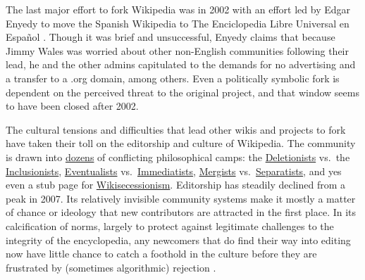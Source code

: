 The last major effort to fork Wikipedia was in 2002 with an effort led
by Edgar Enyedy to move the Spanish Wikipedia to The Enciclopedia Libre
Universal en Español \citep{tkaczSpanishForkWikipedia2011, tkaczWikipediaPoliticsOpenness2014} . Though it was brief and
unsuccessful, Enyedy claims that because Jimmy Wales was worried about
other non-English communities following their lead, he and the other
admins capitulated to the demands for no advertising and a transfer to a
.org domain, among others. Even a politically symbolic fork is
dependent on the perceived threat to the original project, and that
window seems to have been closed after 2002.

The cultural tensions and difficulties that lead other wikis and
projects to fork have taken their toll on the editorship and culture of
Wikipedia. The community is drawn into
\href{https://meta.wikimedia.org/wiki/Conflicting_Wikipedia_philosophies}{dozens}
of conflicting philosophical camps: the
\href{https://meta.wikimedia.org/wiki/Special:MyLanguage/Deletionism}{Deletionists} vs.~the
\href{https://meta.wikimedia.org/wiki/Special:MyLanguage/Inclusionism}{Inclusionists},
\href{https://meta.wikimedia.org/wiki/Eventualism}{Eventualists}
vs.~\href{https://meta.wikimedia.org/wiki/Immediatism}{Immediatists},
\href{https://meta.wikimedia.org/wiki/Special:MyLanguage/Mergism}{Mergists}
vs.~\href{https://meta.wikimedia.org/wiki/Special:MyLanguage/Separatism}{Separatists},
and yes even a stub page for
\href{https://meta.wikimedia.org/wiki/Wikisecessionism}{Wikisecessionism}.
Editorship has steadily declined from a peak in 2007. Its relatively
invisible community systems make it mostly a matter of chance or
ideology that new contributors are attracted in the first place. In its
calcification of norms, largely to protect against legitimate challenges
to the integrity of the encyclopedia, any newcomers that do find their
way into editing now have little chance to catch a foothold in the
culture before they are frustrated by (sometimes algorithmic) rejection
\citep{hillWikipediaEndOpen2019, halfakerRiseDeclineOpen2013} .

